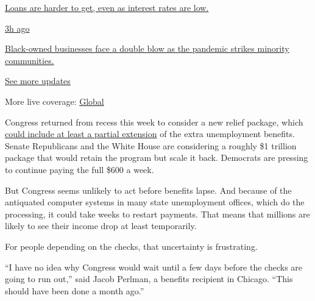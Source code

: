 \href{https://www.nytimes.com/live/2020/08/04/business/stock-market-today-coronavirus?action=click\&pgtype=Article\&state=default\&region=MAIN_CONTENT_1\&context=storylines_live_updates\#loans-are-harder-to-get-even-as-interest-rates-are-low}{Loans
are harder to get, even as interest rates are low.}

\href{https://www.nytimes.com/live/2020/08/04/business/stock-market-today-coronavirus?action=click\&pgtype=Article\&state=default\&region=MAIN_CONTENT_1\&context=storylines_live_updates\#black-owned-businesses-face-a-double-blow-as-the-pandemic-strikes-minority-communities}{3h
ago}

\href{https://www.nytimes.com/live/2020/08/04/business/stock-market-today-coronavirus?action=click\&pgtype=Article\&state=default\&region=MAIN_CONTENT_1\&context=storylines_live_updates\#black-owned-businesses-face-a-double-blow-as-the-pandemic-strikes-minority-communities}{Black-owned
businesses face a double blow as the pandemic strikes minority
communities.}

\href{https://www.nytimes.com/live/2020/08/04/business/stock-market-today-coronavirus?action=click\&pgtype=Article\&state=default\&region=MAIN_CONTENT_1\&context=storylines_live_updates}{See
more updates}

More live coverage:
\href{https://www.nytimes.com/2020/08/04/world/coronavirus-cases.html?action=click\&pgtype=Article\&state=default\&region=MAIN_CONTENT_1\&context=storylines_live_updates}{Global}

Congress returned from recess this week to consider a new relief
package, which
\href{https://www.nytimes.com/2020/07/20/us/politics/congress-coronavirus-aid-package.html}{could
include at least a partial extension} of the extra unemployment
benefits. Senate Republicans and the White House are considering a
roughly \$1 trillion package that would retain the program but scale it
back. Democrats are pressing to continue paying the full \$600 a week.

But Congress seems unlikely to act before benefits lapse. And because of
the antiquated computer systems in many state unemployment offices,
which do the processing, it could take weeks to restart payments. That
means that millions are likely to see their income drop at least
temporarily.

For people depending on the checks, that uncertainty is frustrating.

``I have no idea why Congress would wait until a few days before the
checks are going to run out,'' said Jacob Perlman, a benefits recipient
in Chicago. ``This should have been done a month ago.''

